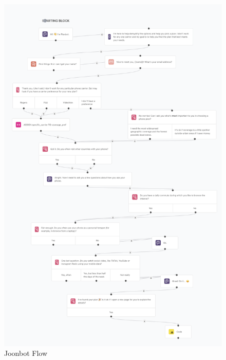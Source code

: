 \documentclass[conference]{IEEEtran}
\begin{document}
\begin{figure}[H]
    \centering
    \includegraphics[width=1\linewidth]{joonbot-flow.png}
    \caption{Joonbot Flow}
    \label{fig:user flow}
\end{figure}
\end{document}
